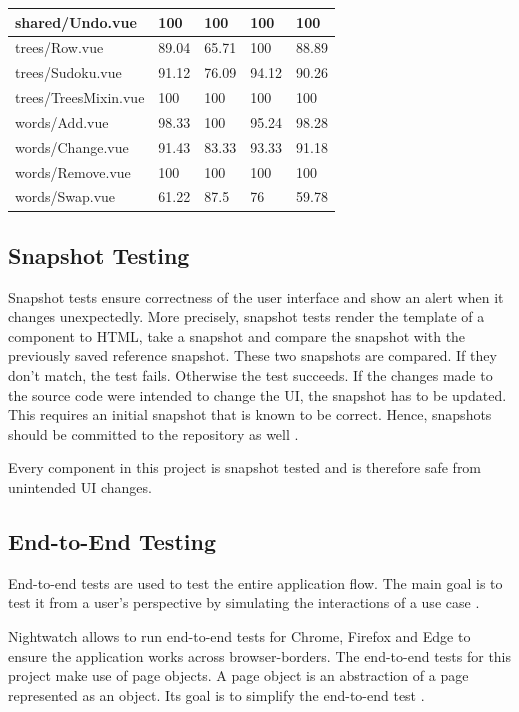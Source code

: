 \begin{table}
\begin{adjustwidth}{-2cm}{}
\begin{tabular}{|l|l|l|l|l|}
            shared/Undo.vue & 100 & 100 & 100 & 100 \\ \hline
            trees/Row.vue & 89.04 & 65.71 & 100 & 88.89 \\ \hline
            trees/Sudoku.vue & 91.12 & 76.09 & 94.12 & 90.26 \\ \hline
            trees/TreesMixin.vue & 100 & 100 & 100 & 100 \\ \hline
            words/Add.vue & 98.33 & 100 & 95.24 & 98.28 \\ \hline
            words/Change.vue & 91.43 & 83.33 & 93.33 & 91.18 \\ \hline
            words/Remove.vue & 100 & 100 & 100 & 100 \\ \hline
            words/Swap.vue & 61.22 & 87.5 & 76 & 59.78 \\ \hline
        \end{tabular}
        \label{table:testCoverage}
    \end{adjustwidth}
\end{table}

\subsection{Snapshot Testing}
\label{subsection:snapshotTesting}
Snapshot tests ensure correctness of the user interface and show an alert when it changes unexpectedly. More precisely, snapshot tests render the template of a component to HTML, take a snapshot and compare the snapshot with the previously saved reference snapshot. These two snapshots are compared. If they don't match, the test fails. Otherwise the test succeeds. If the changes made to the source code were intended to change the UI, the snapshot has to be updated. This requires an initial snapshot that is known to be correct. Hence, snapshots should be committed to the repository as well \cite{Jest}.

Every component in this project is snapshot tested and is therefore safe from unintended UI changes.

\subsection{End-to-End Testing}
\label{subsection:e2e}
End-to-end tests are used to test the entire application flow. The main goal is to test it from a user's perspective by simulating the interactions of a use case \cite{EndToEndTests}. 

Nightwatch allows to run end-to-end tests for Chrome, Firefox and Edge to ensure the application works across browser-borders. The end-to-end tests for this project make use of page objects. A page object is an abstraction of a page represented as an object. Its goal is to simplify the end-to-end test \cite{Nightwatch}.

